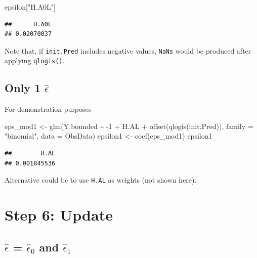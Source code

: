 \documentclass[
]{book}
\newenvironment{Shaded}{\begin{snugshade}}{\end{snugshade}}
\newcommand{\AttributeTok}[1]{\textcolor[rgb]{0.77,0.63,0.00}{#1}}
\newcommand{\DecValTok}[1]{\textcolor[rgb]{0.00,0.00,0.81}{#1}}
\newcommand{\FunctionTok}[1]{\textcolor[rgb]{0.00,0.00,0.00}{#1}}
\newcommand{\NormalTok}[1]{#1}
\newcommand{\OtherTok}[1]{\textcolor[rgb]{0.56,0.35,0.01}{#1}}
\newcommand{\SpecialCharTok}[1]{\textcolor[rgb]{0.00,0.00,0.00}{#1}}
\newcommand{\StringTok}[1]{\textcolor[rgb]{0.31,0.60,0.02}{#1}}
\begin{document}
\begin{Shaded}
\begin{Highlighting}[]
\NormalTok{epsilon[}\StringTok{"H.A0L"}\NormalTok{] }
\end{Highlighting}
\end{Shaded}

\begin{verbatim}
##      H.A0L 
## 0.02070037
\end{verbatim}

Note that, if \texttt{init.Pred} includes negative values, \texttt{NaNs} would be produced after applying \texttt{qlogis()}.

\hypertarget{only-1-hatepsilon}{%
\subsection{\texorpdfstring{Only 1 \(\hat\epsilon\)}{Only 1 \textbackslash hat\textbackslash epsilon}}\label{only-1-hatepsilon}}

For demonstration purposes

\begin{Shaded}
\begin{Highlighting}[]
\NormalTok{eps\_mod1 }\OtherTok{\textless{}{-}} \FunctionTok{glm}\NormalTok{(Y.bounded }\SpecialCharTok{\textasciitilde{}} \SpecialCharTok{{-}}\DecValTok{1} \SpecialCharTok{+}\NormalTok{ H.AL }\SpecialCharTok{+}
                 \FunctionTok{offset}\NormalTok{(}\FunctionTok{qlogis}\NormalTok{(init.Pred)),}
               \AttributeTok{family =} \StringTok{"binomial"}\NormalTok{,}
               \AttributeTok{data =}\NormalTok{ ObsData)}
\NormalTok{epsilon1 }\OtherTok{\textless{}{-}} \FunctionTok{coef}\NormalTok{(eps\_mod1) }
\NormalTok{epsilon1 }
\end{Highlighting}
\end{Shaded}

\begin{verbatim}
##        H.AL 
## 0.001845536
\end{verbatim}

Alternative could be to use \texttt{H.AL} as weights (not shown here).

\hypertarget{step-6-update}{%
\section{Step 6: Update}\label{step-6-update}}

\hypertarget{hatepsilon-hatepsilon_0-and-hatepsilon_1-1}{%
\subsection{\texorpdfstring{\(\hat\epsilon\) = \(\hat\epsilon_0\) and \(\hat\epsilon_1\)}{\textbackslash hat\textbackslash epsilon = \textbackslash hat\textbackslash epsilon\_0 and \textbackslash hat\textbackslash epsilon\_1}}\label{hatepsilon-hatepsilon_0-and-hatepsilon_1-1}}
\end{document}
